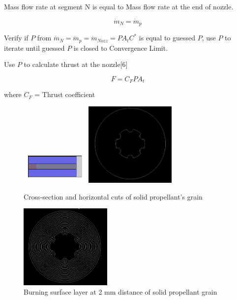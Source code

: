 \documentclass[conference]{IEEEtran}
\begin{document}
Mass flow rate at segment N is equal to Mass flow rate at the end of nozzle.
\begin{center}
\begin{equation}
\dot{m}_{N} = \dot{m}_{p}
\end{equation}
\end{center}

Verify if $P$ from $\dot{m}_{N} = \dot{m}_{p}= \dot{m}_{Nozz}= P{A}_tC^{*}$ is equal to guessed $P$, use $P$ to iterate until guessed $P$ is closed to Convergence Limit.

Use $P$ to calculate thrust at the nozzle[6] 
	
\begin{center}
\begin{equation}
F={C}_FP{A}_t
\end{equation}
\end{center}
where ${C}_F$ = Thrust coefficient


\begin{figure}[t]
\centering
\includegraphics[width=0.3\textwidth]{horizontal_cut}
\includegraphics[width=0.4\textwidth]{cross_section}
\caption{Cross-section and horizontal cuts of solid propellant's grain}
\label{fig:1}
\end{figure}

\begin{figure}[t]
\centering
\includegraphics[width=0.4\textwidth]{burnlayer}
\caption{Burning surface layer at 2 mm distance of solid propellant grain}
\label{fig:2}
\end{figure}
\end{document}
